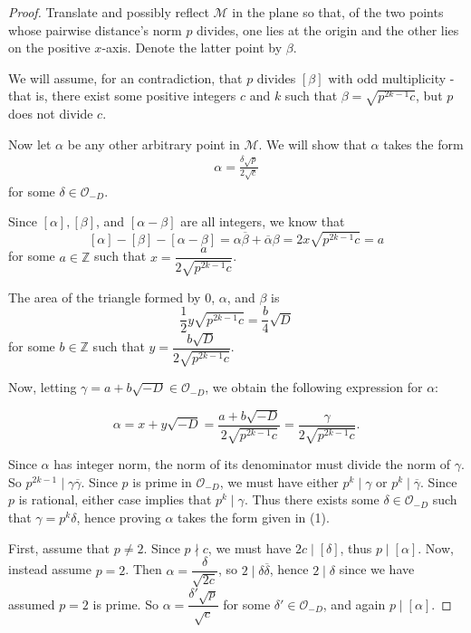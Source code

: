 \documentclass[a4paper]{article}
\theoremstyle{plain}
\theoremstyle{definition}
\newcommand{\thering}
{
\mathcal{O}_{-D}
}
\newcommand{\M}
{
\mathcal{M}
}
\newcommand{\norm}[1]
{
\left[ #1 \right]
}
\newcommand{\conj}[1]
{
\overline{#1}
}
\begin{document}
\begin{proof}

Translate and possibly reflect $\M$ in the plane so that, of the two points whose pairwise distance's norm $p$ divides, one lies at the origin and the other lies on the positive $x$-axis.  Denote the latter point by $\beta$.

We will assume, for an contradiction, that $p$ divides $\norm{\beta}$ with odd multiplicity - that is, there exist some positive integers $c$ and $k$ such that $\beta = \sqrt{p^{2k-1}c}$, but $p$ does not divide $c$.

Now let $\alpha$ be any other arbitrary point in $\M$.  We will show that $\alpha$ takes the form 
\begin{align}
\alpha = \frac{\delta\sqrt{p}}{2\sqrt{c}}
\end{align}
for some $\delta \in \thering$.

Since $\norm{\alpha}, \norm{\beta}$, and $\norm{\alpha - \beta}$ are all integers, we know that
$$\norm{\alpha} - \norm{\beta} - \norm{\alpha - \beta} = \alpha\conj{\beta} + \conj{\alpha}\beta = 2x\sqrt{p^{2k-1}c} = a$$ for some $a \in \mathbb{Z}$ such that $x = \dfrac{a}{2\sqrt{p^{2k-1}c}}$.

The area of the triangle formed by $0$, $\alpha$, and $\beta$ is $$\frac{1}{2}y\sqrt{p^{2k-1}c} = \frac{b}{4}\sqrt{D}$$ for some $b \in \mathbb{Z}$ such that $y = \dfrac{b\sqrt{D}}{2\sqrt{p^{2k-1}c}}$.

Now, letting $\gamma = a + b\sqrt{-D} \in \thering$, we obtain the following expression for $\alpha$:

$$\alpha = x + y\sqrt{-D} = \frac{a + b\sqrt{-D}}{2\sqrt{p^{2k-1}c}} = \frac{\gamma}{2\sqrt{p^{2k-1}c}}.$$

Since $\alpha$ has integer norm, the norm of its denominator must divide the norm of $\gamma$.  So $p^{2k-1} \mid \gamma \conj{\gamma}$.  Since $p$ is prime in $\thering$, we must have either $p^k \mid \gamma$ or $p^k \mid \conj{\gamma}$.  Since $p$ is rational, either case implies that $p^k \mid \gamma$.  Thus there exists some $\delta \in \thering$ such that $\gamma = p^k\delta$, hence proving $\alpha$ takes the form given in (1).

First, assume that $p \neq 2$.  Since $p \nmid c$, we must have $2c \mid \norm{\delta}$, thus $p \mid \norm{\alpha}$.  Now, instead assume $p = 2$.  Then $\alpha = \dfrac{\delta}{\sqrt{2c}}$, so $2 \mid \delta \conj{\delta}$, hence $2 \mid \delta$ since we have assumed $p = 2$ is prime.  So $\alpha = \dfrac{\delta'\sqrt{p}}{\sqrt{c}}$ for some $\delta' \in \thering$, and again $p \mid \norm{\alpha}$.


\end{proof}
\end{document}
